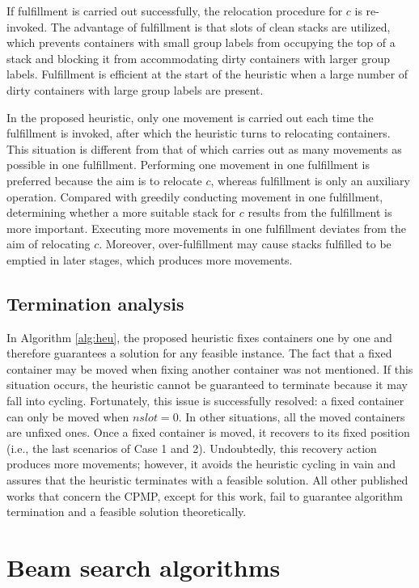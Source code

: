 \documentclass[review,3p,times,authoryear,12pt]{elsarticle}
\begin{document}
If fulfillment is carried out successfully, the relocation procedure for $c$ is re-invoked.
The advantage of fulfillment is that slots of clean stacks are utilized, which prevents containers with small group labels from occupying the top of a stack and blocking it from accommodating dirty containers with larger group labels.
Fulfillment is efficient at the start of the heuristic when a large number of dirty containers with large group labels are present.

In the proposed heuristic, only one movement is carried out each time the fulfillment is invoked, after which the heuristic turns to relocating containers.
This situation is different from that of \cite{Exposito2012} which carries out as many movements as possible in one fulfillment.
Performing one movement in one fulfillment is preferred because the aim is to relocate $c$, whereas fulfillment is only an auxiliary operation.
Compared with greedily conducting movement in one fulfillment, determining whether a more suitable stack for $c$ results from the fulfillment is more important.
Executing more movements in one fulfillment deviates from the aim of relocating $c$.
Moreover, over-fulfillment may cause stacks fulfilled to be emptied in later stages, which produces more movements.

\subsection{Termination analysis}

In Algorithm \ref{alg:heu}, the proposed heuristic fixes containers one by one and therefore guarantees a solution for any feasible instance. The fact that a fixed container may be moved when fixing another container was not mentioned.
If this situation occurs, the heuristic cannot be guaranteed to terminate because it may fall into cycling.
Fortunately, this issue is successfully resolved: a fixed container can only be moved when $\mathit{nslot}=0$.
In other situations, all the moved containers are unfixed ones. Once a fixed container is moved, it recovers to its fixed position (i.e., the last scenarios of Case 1 and 2).
Undoubtedly, this recovery action produces more movements; however, it avoids the heuristic cycling in vain and assures that the heuristic terminates with a feasible solution.
All other published works that concern the CPMP, except for this work, fail to guarantee algorithm termination and a feasible solution theoretically.

\section{Beam search algorithms}
\label{sec:g2la}
\end{document}
